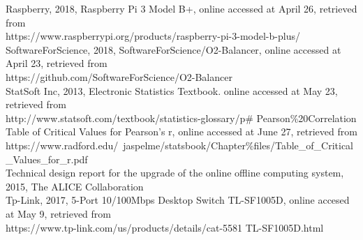 Raspberry, 2018, Raspberry Pi 3 Model B+, online accessed at April 26, retrieved from \\https://www.raspberrypi.org/products/raspberry-pi-3-model-b-plus/\\

SoftwareForScience, 2018, SoftwareForScience/O2-Balancer, online accessed at April 23, retrieved from \\https://github.com/SoftwareForScience/O2-Balancer\\

StatSoft Inc, 2013, Electronic Statistics Textbook. online accessed at May 23, retrieved from  \\http://www.statsoft.com/textbook/statistics-glossary/p\# Pearson\%20Correlation\\

Table of Critical Values for Pearson's r, online accessed at June 27, retrieved from \\https://www.radford.edu/~jaspelme/statsbook/Chapter\%files/Table_of_Critical_Values_for_r.pdf\\

Technical design report for the upgrade of the online offline computing system, 2015, The ALICE Collaboration\\

Tp-Link, 2017, 5-Port 10/100Mbps Desktop Switch TL-SF1005D, online accesed at May 9, retrieved from \\https://www.tp-link.com/us/products/details/cat-5581 TL-SF1005D.html\\